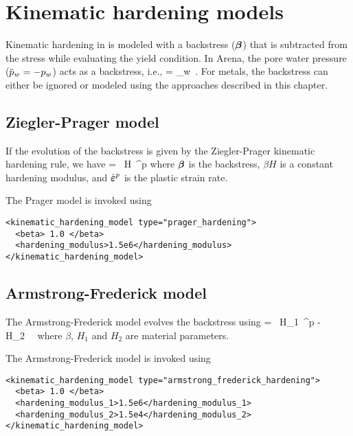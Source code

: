 \chapter{Kinematic hardening models} \label{ch:kin_hard}
Kinematic hardening in \Vaango is modeled with a backstress ($\boldsymbol{\beta}$) that is
subtracted from the stress while evaluating the yield condition.  In Arena, the
pore water pressure ($\pbar_w = -p_w$) acts as a backstress, i.e.,
\Beq
  \Bbeta = \pbar_w \BI \,.
\Eeq
For metals, the backstress can either be ignored or modeled using the approaches described
in this chapter.

\section{Ziegler-Prager model}
If the evolution of the backstress is given by the Ziegler-Prager kinematic hardening rule, we have
\Beq \label{eq:kin_ZP}
  \dot{\Bbeta} = ~\beta H~\dot{\BVeps}^p 
\Eeq
where $\boldsymbol{\beta}$ is the backstress, $\beta H$ is a constant hardening modulus, and $\dot{\boldsymbol{\varepsilon}}^p$ is
the plastic strain rate.

The Prager model is invoked using
\lstset{language=XML}
\begin{lstlisting}
<kinematic_hardening_model type="prager_hardening">
  <beta> 1.0 </beta>
  <hardening_modulus>1.5e6</hardening_modulus>
</kinematic_hardening_model>
\end{lstlisting}

\section{Armstrong-Frederick model}
The Armstrong-Frederick model evolves the backstress using
\Beq \label{eq:kin_AF}
  \dot{\Bbeta} = ~\beta H_1~\dot{\BVeps}^p - \beta H_2~\Bbeta~ 
\Eeq
where $\beta$, $H_1$ and $H_2$ are material parameters.

The Armstrong-Frederick model is invoked using
\lstset{language=XML}
\begin{lstlisting}
<kinematic_hardening_model type="armstrong_frederick_hardening">
  <beta> 1.0 </beta>
  <hardening_modulus_1>1.5e6</hardening_modulus_1>
  <hardening_modulus_2>1.5e4</hardening_modulus_2>
</kinematic_hardening_model>
\end{lstlisting}


